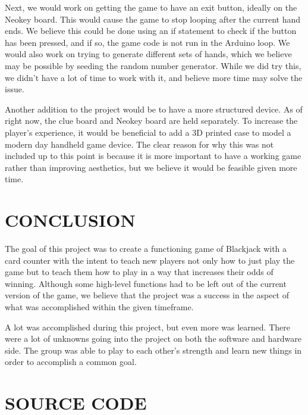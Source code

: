 \documentclass[12pt]{article}
\begin{document}
Next, we would work on getting the game to have an exit button, ideally on the Neokey board. This would cause the game to stop looping after the current hand ends. We believe this could be done using an if statement to check if the button has been pressed, and if so, the game code is not run in the Arduino loop. We would also work on trying to generate different sets of hands, which we believe may be possible by seeding the random number generator. While we did try this, we didn’t have a lot of time to work with it, and believe more time may solve the issue.

Another addition to the project would be to have a more structured device. As of right now, the clue board and Neokey board are held separately. To increase the player’s experience, it would be beneficial to add a 3D printed case to model a modern day handheld game device. The clear reason for why this was not included up to this point is because it is more important to have a working game rather than improving aesthetics, but we believe it would be feasible given more time. 

\section{CONCLUSION}
The goal of this project was to create a functioning game of Blackjack with a card counter with the intent to teach new players not only how to just play the game but to teach them how to play in a way that increases their odds of winning. Although some high-level functions had to be left out of the current version of the game, we believe that the project was a success in the aspect of what was accomplished within the given timeframe. 

A lot was accomplished during this project, but even more was learned. There were a lot of unknowns going into the project on both the software and hardware side. The group was able to play to each other’s strength and learn new things in order to accomplish a common goal. 

\newpage

\printbibliography[heading=subbibintoc]
\newpage
\appendix

\section{SOURCE CODE}

\end{document}
